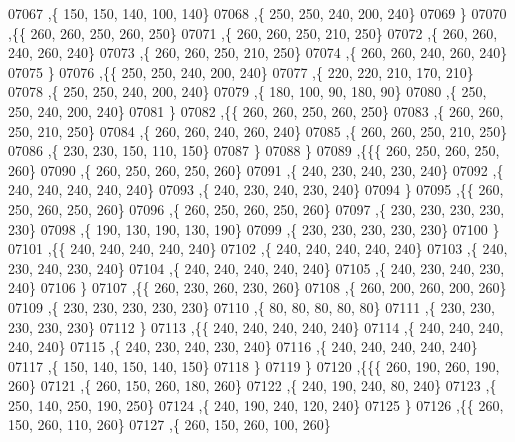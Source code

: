 \begin{DoxyCode}
07067     ,\{   150,   150,   140,   100,   140\}
07068     ,\{   250,   250,   240,   200,   240\}
07069     \}
07070    ,\{\{   260,   260,   250,   260,   250\}
07071     ,\{   260,   260,   250,   210,   250\}
07072     ,\{   260,   260,   240,   260,   240\}
07073     ,\{   260,   260,   250,   210,   250\}
07074     ,\{   260,   260,   240,   260,   240\}
07075     \}
07076    ,\{\{   250,   250,   240,   200,   240\}
07077     ,\{   220,   220,   210,   170,   210\}
07078     ,\{   250,   250,   240,   200,   240\}
07079     ,\{   180,   100,    90,   180,    90\}
07080     ,\{   250,   250,   240,   200,   240\}
07081     \}
07082    ,\{\{   260,   260,   250,   260,   250\}
07083     ,\{   260,   260,   250,   210,   250\}
07084     ,\{   260,   260,   240,   260,   240\}
07085     ,\{   260,   260,   250,   210,   250\}
07086     ,\{   230,   230,   150,   110,   150\}
07087     \}
07088    \}
07089   ,\{\{\{   260,   250,   260,   250,   260\}
07090     ,\{   260,   250,   260,   250,   260\}
07091     ,\{   240,   230,   240,   230,   240\}
07092     ,\{   240,   240,   240,   240,   240\}
07093     ,\{   240,   230,   240,   230,   240\}
07094     \}
07095    ,\{\{   260,   250,   260,   250,   260\}
07096     ,\{   260,   250,   260,   250,   260\}
07097     ,\{   230,   230,   230,   230,   230\}
07098     ,\{   190,   130,   190,   130,   190\}
07099     ,\{   230,   230,   230,   230,   230\}
07100     \}
07101    ,\{\{   240,   240,   240,   240,   240\}
07102     ,\{   240,   240,   240,   240,   240\}
07103     ,\{   240,   230,   240,   230,   240\}
07104     ,\{   240,   240,   240,   240,   240\}
07105     ,\{   240,   230,   240,   230,   240\}
07106     \}
07107    ,\{\{   260,   230,   260,   230,   260\}
07108     ,\{   260,   200,   260,   200,   260\}
07109     ,\{   230,   230,   230,   230,   230\}
07110     ,\{    80,    80,    80,    80,    80\}
07111     ,\{   230,   230,   230,   230,   230\}
07112     \}
07113    ,\{\{   240,   240,   240,   240,   240\}
07114     ,\{   240,   240,   240,   240,   240\}
07115     ,\{   240,   230,   240,   230,   240\}
07116     ,\{   240,   240,   240,   240,   240\}
07117     ,\{   150,   140,   150,   140,   150\}
07118     \}
07119    \}
07120   ,\{\{\{   260,   190,   260,   190,   260\}
07121     ,\{   260,   150,   260,   180,   260\}
07122     ,\{   240,   190,   240,    80,   240\}
07123     ,\{   250,   140,   250,   190,   250\}
07124     ,\{   240,   190,   240,   120,   240\}
07125     \}
07126    ,\{\{   260,   150,   260,   110,   260\}
07127     ,\{   260,   150,   260,   100,   260\}

\end{DoxyCode}
